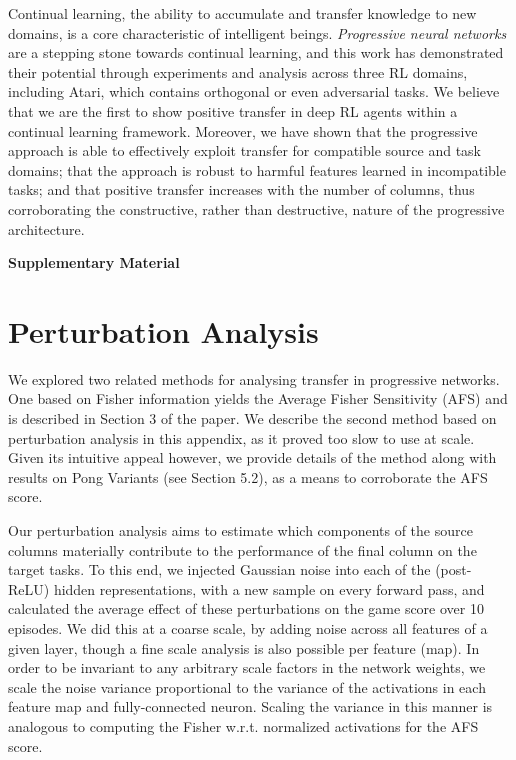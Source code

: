 \documentclass{article}
\begin{document}
Continual learning, the ability to accumulate and transfer knowledge to new domains, is a core characteristic of intelligent beings. \textit{Progressive neural networks} are a stepping stone towards continual learning, and this work has demonstrated their potential through experiments and analysis across three RL domains, including Atari, which contains orthogonal or even adversarial tasks. We believe that we are the first to show positive transfer in deep RL agents within a continual learning framework. Moreover, we have shown that the progressive approach is able to effectively exploit transfer for compatible source and task domains; that the approach is robust to harmful features learned in incompatible tasks; and that positive transfer increases with the number of columns, thus corroborating the constructive, rather than destructive, nature of the progressive architecture.



\newpage
\footnotesize
\setlength{\bibsep}{5pt}



\newpage

\appendix
{}

{\Large{\textbf{Supplementary Material}}}


\section{Perturbation Analysis}

We explored two related methods for analysing transfer in progressive networks.
One based on Fisher information yields the Average Fisher Sensitivity (AFS)
and is described in Section 3 of the paper. We describe
the second method based on perturbation analysis in this appendix, as it proved
too slow to use at scale. Given its intuitive appeal however, we provide
details of the method along with results on Pong Variants (see
Section 5.2), as a means to corroborate the AFS score.

Our perturbation analysis aims to estimate which components of the source
columns materially contribute to the performance of the final column on the
target tasks. To this end, we injected Gaussian noise into each of the (post-ReLU) hidden
representations, with a new sample on every forward pass, and calculated the
average effect of these perturbations on the game score over 10 episodes.  We
did this at a coarse scale, by adding noise across all features of a given
layer, though a fine scale analysis is also possible per feature (map).
In order to be invariant to any arbitrary scale factors in the network weights,
we scale the noise variance proportional to the variance of the activations in
each feature map and fully-connected neuron. Scaling the variance in this
manner is analogous to computing the Fisher w.r.t. normalized activations for
the AFS score.
\end{document}
